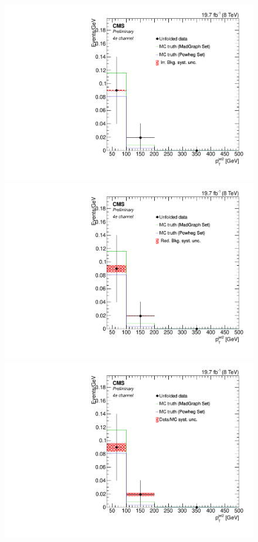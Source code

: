 \begin{figure}[hbtp]
\begin{center}
   \includegraphics[width=0.8\cmsFigWidth]{Figures/Unfolding/Systematics/ZZTo4e_PtJet2_IrrBkg_Mad_fr}
   \includegraphics[width=0.8\cmsFigWidth]{Figures/Unfolding/Systematics/ZZTo4e_PtJet2_RedBkg_Mad_fr}     
  \includegraphics[width=0.8\cmsFigWidth]{Figures/Unfolding/Systematics/ZZTo4e_PtJet2_UnfDataOverGenMC_Mad_fr}     

\end{center}
\end{figure}
